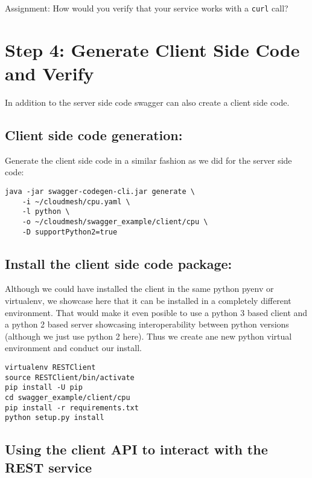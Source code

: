 Assignment: How would you verify that your service works with a
\texttt{curl} call?

\section{Step 4: Generate Client Side Code and
Verify}\label{step-4-generate-client-side-code-and-verify}

In addition to the server side code swagger can also create a client
side code.

\subsection{Client side code
generation:}\label{client-side-code-generation}

Generate the client side code in a similar fashion as we did for the
server side code:

\begin{lstlisting}
java -jar swagger-codegen-cli.jar generate \
    -i ~/cloudmesh/cpu.yaml \
    -l python \
    -o ~/cloudmesh/swagger_example/client/cpu \
    -D supportPython2=true
\end{lstlisting}

\subsection{Install the client side code
package:}\label{install-the-client-side-code-package}

Although we could have installed the client in the same python pyenv or
virtualenv, we showcase here that it can be installed in a completely
different environment. That would make it even posible to use a python 3
based client and a python 2 based server showcasing interoperability
between python versions (although we just use python 2 here). Thus we
create ane new python virtual environment and conduct our install.

\begin{lstlisting}
virtualenv RESTClient
source RESTClient/bin/activate
pip install -U pip
cd swagger_example/client/cpu
pip install -r requirements.txt
python setup.py install
\end{lstlisting}

\subsection{Using the client API to interact with the REST
service}\label{using-the-client-api-to-interact-with-the-rest-service}

